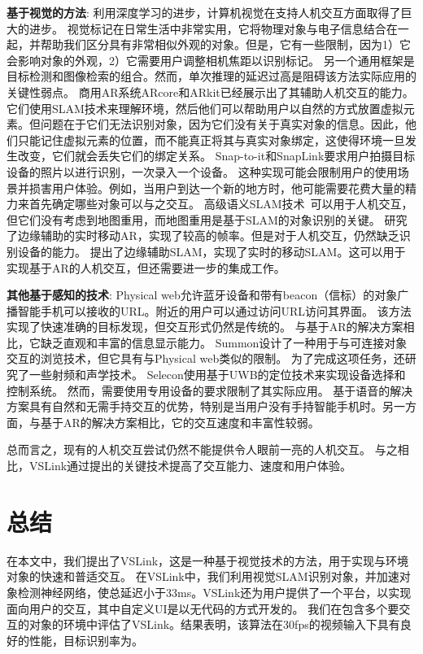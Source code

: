 \textbf{基于视觉的方法}: 
利用深度学习的进步，计算机视觉在支持人机交互方面取得了巨大的进步。
视觉标记\cite{wang2010design,olson2011apriltag}在日常生活中非常实用，它将物理对象与电子信息结合在一起，并帮助我们区分具有非常相似外观的对象。但是，它有一些限制，因为1）它会影响对象的外观，2）它需要用户调整相机焦距以识别标记。
另一个通用框架是目标检测\cite{ren2015faster,redmon2018yolov3,qin2019thundernet}和图像检索\cite{philbin2008lost,zheng2017sift}的组合。然而，单次推理的延迟过高是阻碍该方法实际应用的关键性弱点。
商用AR系统ARcore\cite{arcore}和ARkit\cite{arkit}已经展示出了其辅助人机交互的能力。
它们使用SLAM技术来理解环境，然后他们可以帮助用户以自然的方式放置虚拟元素。但问题在于它们无法识别对象，因为它们没有关于真实对象的信息。因此，他们只能记住虚拟元素的位置，而不能真正将其与真实对象绑定，这使得环境一旦发生改变，它们就会丢失它们的绑定关系。
Snap-to-it\cite{de2016snap}和SnapLink\cite{chen2018snaplink}要求用户拍摄目标设备的照片以进行识别，一次录入一个设备。
这种实现可能会限制用户的使用场景并损害用户体验。例如，当用户到达一个新的地方时，他可能需要花费大量的精力来首先确定哪些对象可以与之交互。
高级语义SLAM技术~\cite{strecke2019fusion,runz2018maskfusion,salas2013slam++}可以用于人机交互，但它们没有考虑到地图重用，而地图重用是基于SLAM的对象识别的关键。
\cite{liu2019edge}研究了边缘辅助的实时移动AR，实现了较高的帧率。但是对于人机交互，\cite{liu2019edge}仍然缺乏识别设备的能力。
\cite{ben2020edge,xu2020edge,liu2021edgesharing}提出了边缘辅助SLAM，实现了实时的移动SLAM。这可以用于实现基于AR的人机交互，但还需要进一步的集成工作。

\textbf{其他基于感知的技术}: 
Physical web\cite{jenson2014physical}允许蓝牙设备和带有beacon（信标）的对象广播智能手机可以接收的URL。附近的用户可以通过访问URL访问其界面。
该方法实现了快速准确的目标发现，但交互形式仍然是传统的。
与基于AR的解决方案相比，它缺乏直观和丰富的信息显示能力。
Summon\cite{zachariah2020browsing}设计了一种用于与可连接对象交互的浏览技术，但它具有与Physical web类似的限制。
为了完成这项任务，还研究了一些射频和声学技术\cite{alanwar2017selecon,pu2013whole,mao2016cat}。
Selecon\cite{alanwar2017selecon}使用基于UWB的定位技术来实现设备选择和控制系统。
然而，需要使用专用设备的要求限制了其实际应用。
基于语音的解决方案具有自然和无需手持交互的优势，特别是当用户没有手持智能手机时。另一方面，与基于AR的解决方案相比，它的交互速度和丰富性较弱。

总而言之，现有的人机交互尝试仍然不能提供令人眼前一亮的人机交互。
与之相比，VSLink通过提出的关键技术提高了交互能力、速度和用户体验。

\chapter{总结}\label{chap:sum}
在本文中，我们提出了VSLink，这是一种基于视觉技术的方法，用于实现与环境对象的快速和普适交互。
在VSLink中，我们利用视觉SLAM识别对象，并加速对象检测神经网络，使总延迟小于33ms。VSLink还为用户提供了一个平台，以实现面向用户的交互，其中自定义UI是以无代码的方式开发的。
我们在包含多个要交互的对象的环境中评估了VSLink。结果表明，该算法在30fps的视频输入下具有良好的性能，目标识别率为{\acc}。

